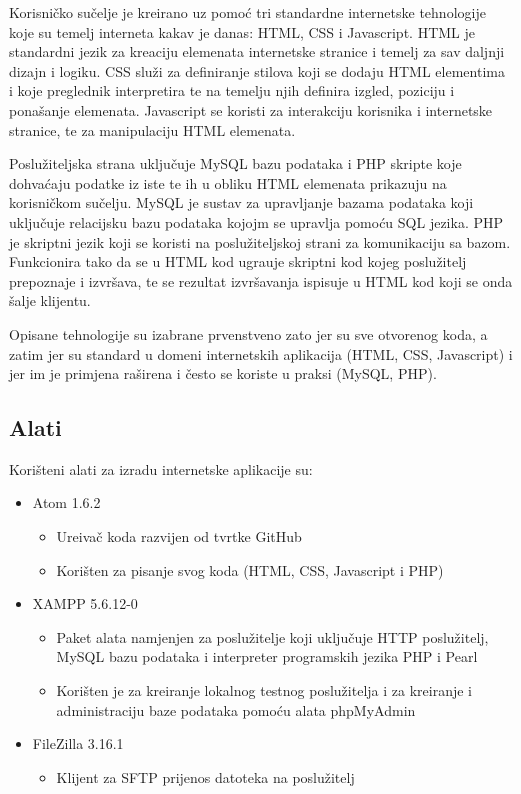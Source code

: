 Korisni\v{c}ko su\v{c}elje je kreirano uz pomo\'{c} tri standardne internetske tehnologije koje su temelj interneta kakav je danas: HTML, CSS i Javascript. HTML \cite{html} je standardni jezik za kreaciju elemenata internetske stranice i temelj za sav daljnji dizajn i logiku. CSS \cite{css} slu\v{z}i za definiranje stilova koji se dodaju HTML elementima i koje preglednik interpretira te na temelju njih definira izgled, poziciju i pona\v{s}anje elemenata. Javascript \cite{javascript} se koristi za interakciju korisnika i internetske stranice, te za manipulaciju HTML elemenata.

Poslu\v{z}iteljska strana uklju\v{c}uje MySQL bazu podataka i PHP skripte koje dohva\'{c}aju podatke iz iste te ih u obliku HTML elemenata prikazuju na korisni\v{c}kom su\v{c}elju. MySQL je sustav za upravljanje bazama podataka koji uklju\v{c}uje relacijsku bazu podataka kojojm se upravlja pomo\'{c}u SQL jezika. PHP je skriptni jezik koji se koristi na poslu\v{z}iteljskoj strani za komunikaciju sa bazom. Funkcionira tako da se u HTML kod ugra\dj uje skriptni kod kojeg poslu\v{z}itelj prepoznaje i izvr\v{s}ava, te se rezultat izvr\v{s}avanja ispisuje u HTML kod koji se onda \v{s}alje klijentu.

Opisane tehnologije su izabrane prvenstveno zato jer su sve otvorenog koda, a zatim jer su standard u domeni internetskih aplikacija (HTML, CSS, Javascript) i jer im je primjena ra\v{s}irena i \v{c}esto se koriste u praksi (MySQL, PHP).

\subsection{Alati}
Kori\v{s}teni alati za izradu internetske aplikacije su:
\begin{itemize}
	\item Atom 1.6.2 \cite{atom}
	\begin{itemize}
		\item Ure\dj iva\v{c} koda razvijen od tvrtke GitHub
		\item Kori\v{s}ten za pisanje svog koda (HTML, CSS, Javascript i PHP)
	\end{itemize}
	
	\item XAMPP 5.6.12-0 \cite{xampp}
	\begin{itemize}
		\item Paket alata namjenjen za poslu\v{z}itelje koji uklju\v{c}uje HTTP poslu\v{z}itelj, MySQL bazu podataka i interpreter programskih jezika PHP i Pearl
		\item Kori\v{s}ten je za kreiranje lokalnog testnog poslu\v{z}itelja i za kreiranje i administraciju baze podataka pomo\'{c}u alata phpMyAdmin
	\end{itemize}
	
	\item FileZilla 3.16.1 \cite{filezilla}
	\begin{itemize}
		\item Klijent za SFTP prijenos datoteka na poslu\v{z}itelj
	\end{itemize}
\end{itemize}



